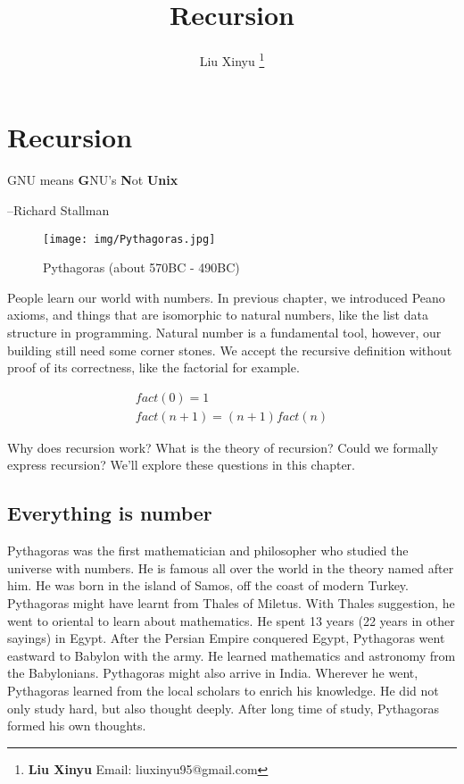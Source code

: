 \documentclass[b5paper]{article}
\begin{document}
\title{Recursion}

\author{Liu Xinyu
\thanks{{\bfseries Liu Xinyu} \newline
  Email: liuxinyu95@gmail.com}}

\maketitle
\fi


\ifx\wholebook\relax
\chapter{Recursion}
\fi

\epigraph{GNU means \textbf{G}NU's \textbf{N}ot \textbf{Unix}}{--Richard Stallman}

\begin{wrapfigure}{R}{0.3\textwidth}
 \centering
 \texttt{[image: img/Pythagoras.jpg]}
 \captionsetup{labelformat=empty}
 \caption{Pythagoras (about 570BC - 490BC)}
 \label{fig:Pythagoras}
\end{wrapfigure}

People learn our world with numbers. In previous chapter, we introduced Peano axioms, and things that are isomorphic to natural numbers, like the list data structure in programming. Natural number is a fundamental tool, however, our building still need some corner stones. We accept the recursive definition without proof of its correctness, like the factorial for example.

\[
\begin{array}{l}
\textit{fact}(0) = 1 \\
\textit{fact}(n + 1) = (n + 1) \textit{fact}(n)
\end{array}
\]

Why does recursion work? What is the theory of recursion? Could we formally express recursion? We'll explore these questions in this chapter.

\section{Everything is number}

Pythagoras was the first mathematician and philosopher who studied the universe with numbers. He is famous all over the world in the theory named after him. He was born in the island of Samos, off the coast of modern Turkey. Pythagoras might have learnt from Thales of Miletus. With Thales suggestion, he went to oriental to learn about mathematics. He spent 13 years (22 years in other sayings) in Egypt. After the Persian Empire conquered Egypt, Pythagoras went eastward to Babylon with the army. He learned mathematics and astronomy from the Babylonians. Pythagoras might also arrive in India. Wherever he went, Pythagoras learned from the local scholars to enrich his knowledge. He did not only study hard, but also thought deeply. After long time of study, Pythagoras formed his own thoughts\cite{HanXueTao16}.
\end{document}
